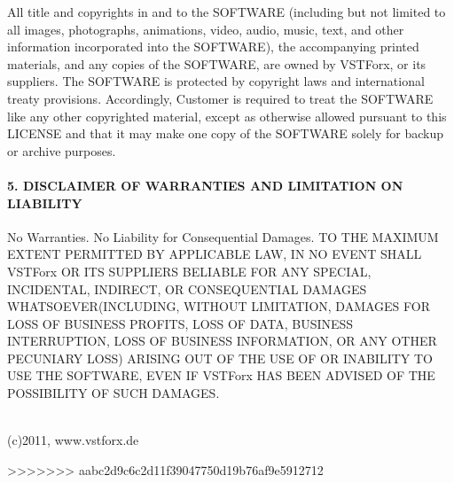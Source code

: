 All title and copyrights in and to the SOFTWARE (including but not limited to all images, photographs, animations, video, audio, music, text, and other information incorporated into the SOFTWARE), the accompanying printed materials, and any copies of the SOFTWARE, are owned by VSTForx, or its suppliers. The SOFTWARE is protected by copyright laws and international treaty provisions. Accordingly, Customer is required to treat the SOFTWARE like any other copyrighted material, except as otherwise allowed pursuant to this LICENSE and that it may make one copy of the SOFTWARE solely for backup or archive purposes.

\paragraph{5. DISCLAIMER OF WARRANTIES AND LIMITATION ON LIABILITY}

No Warranties. No Liability for Consequential Damages. TO THE MAXIMUM EXTENT PERMITTED BY APPLICABLE LAW, IN NO EVENT SHALL VSTForx OR ITS SUPPLIERS BELIABLE FOR ANY SPECIAL, INCIDENTAL, INDIRECT, OR CONSEQUENTIAL DAMAGES WHATSOEVER(INCLUDING, WITHOUT LIMITATION, DAMAGES FOR LOSS OF BUSINESS PROFITS, LOSS OF DATA, BUSINESS INTERRUPTION, LOSS OF BUSINESS INFORMATION, OR ANY OTHER PECUNIARY LOSS) ARISING OUT OF THE USE OF OR INABILITY TO USE THE SOFTWARE, EVEN IF VSTForx HAS BEEN ADVISED OF THE POSSIBILITY OF SUCH DAMAGES.
\\\\
\begin{flushright}
(c)2011, www.vstforx.de
\end{flushright}
>>>>>>> aabc2d9c6c2d11f39047750d19b76af9e5912712
